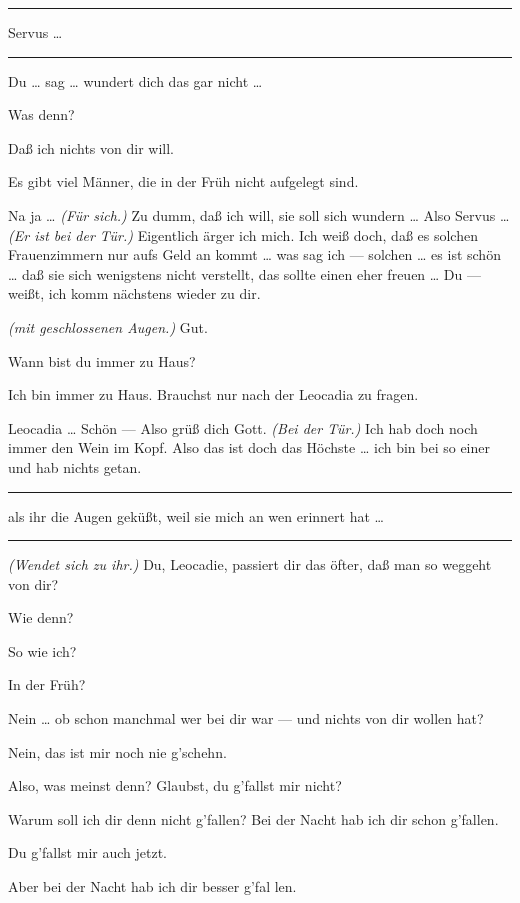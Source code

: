 \documentclass[
	final,
	a4paper,
	ngerman,
	mpinclude = true, %
	twoside = true,
	open = right,
	cleardoublepage = plain,
	DIV = 13,
	BCOR = 1cm,
	titlepage = firstiscover,
	]{scrbook}
\newcommand{\direction}[1]{\textit{(#1)}}
\newenvironment{deletion}{%
		\vspace{0.25\baselineskip}
		\hrule
		\vspace{0.25\baselineskip}
		\color{darkgray}
	}{
		\color{black}
		\vspace{0.25\baselineskip}
		\hrule 
		\vspace{0.25\baselineskip}
	}
\newcommand{\thecharacter}[1]{\textup{\textsc{#1}}\xspace}
\newcommand{\thedirne}{\thecharacter{Nutte}}
\newcommand{\thegraf}{\thecharacter{Entrepeneurin}}
\newcommand{\character}[1]{\item[#1:]}
\newcommand{\dirne}{\character{\thedirne}}
\newcommand{\entrepeneurin}{\character{\thegraf}}
\begin{document}
\begin{play}
\begin{deletion}
	\dirne
	Servus \ldots{}
	\end{deletion}

	\entrepeneurin
	Du \ldots{} sag \ldots{} wundert dich das gar nicht \ldots{}

	\dirne
	Was denn?

	\entrepeneurin
	Daß ich nichts von dir will.

	\dirne
	Es gibt viel Männer, die in der Früh nicht aufgelegt sind.

	\entrepeneurin
	Na ja \ldots{} \direction{Für sich.} Zu dumm, daß ich will, sie soll sich wundern \ldots{} Also Servus \ldots{} \direction{Er ist bei der Tür.} Eigentlich ärger ich mich. Ich weiß doch, daß es solchen Frauenzimmern nur aufs Geld an kommt \ldots{} was sag ich --- solchen \ldots{} es ist schön \ldots{} daß sie sich wenigstens nicht verstellt, das sollte einen eher freuen \ldots{} Du --- weißt, ich komm nächstens wieder zu dir.

	\dirne
	\direction{mit geschlossenen Augen.} Gut.

	\entrepeneurin
	Wann bist du immer zu Haus?

	\dirne
	Ich bin immer zu Haus. Brauchst nur nach der Leocadia zu fragen.

	\entrepeneurin
	Leocadia \ldots{} Schön --- Also grüß dich Gott. \direction{Bei der Tür.} Ich hab doch noch immer den Wein im Kopf. Also das ist doch das Höchste \ldots{} ich bin bei so einer und hab nichts getan.
	\begin{deletion}
		als ihr die Augen geküßt, weil sie mich an wen erinnert hat \ldots{}
	\end{deletion}
	\direction{Wendet sich zu ihr.} Du, Leocadie, passiert dir das öfter, daß man so weggeht von dir?

	\dirne
	Wie denn?

	\entrepeneurin
	So wie ich?

	\dirne
	In der Früh?

	\entrepeneurin
	Nein \ldots{} ob schon manchmal wer bei dir war --- und nichts von dir wollen hat?

	\dirne
	Nein, das ist mir noch nie g'schehn.

	\entrepeneurin
	Also, was meinst denn? Glaubst, du g'fallst mir nicht?

	\dirne
	Warum soll ich dir denn nicht g'fallen? Bei der Nacht hab ich dir schon g'fallen.

	\entrepeneurin
	Du g'fallst mir auch jetzt.

	\dirne
	Aber bei der Nacht hab ich dir besser g'fal len.


\end{play}
\end{document}
